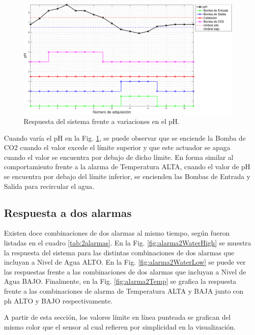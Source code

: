 \begin{figure}[h]
\centering
    \includegraphics[width=\textwidth]{./Figures/plot1pH.pdf}
	\caption{Respuesta del sistema frente a variaciones en el pH.}
	\label{fig:alarma1pH}
\end{figure}

Cuando varía el pH en la Fig. \ref{fig:alarma1pH}, se puede observar que se enciende la Bomba de CO2 cuando el valor excede el límite superior y que este actuador se apaga cuando el valor se encuentra por debajo de dicho límite.  En forma similar al comportamiento frente a la alarma de Temperatura ALTA, cuando el valor de pH se encuentra por debajo del límite inferior, se encienden las Bombas de Entrada y Salida para recircular el agua.

\subsection{Respuesta a dos alarmas}
\label{sec:2alarma}

Existen doce combinaciones de dos alarmas al mismo tiempo, según fueron listadas en el cuadro \ref{tab:2alarmas}. En la Fig. \ref{fig:alarma2WaterHigh} se muestra la respuesta del sistema para las distintas combinaciones de dos alarmas que incluyan a Nivel de Agua ALTO.  En la Fig. \ref{fig:alarma2WaterLow} se puede ver las respuestas frente a las combinaciones de dos alarmas que incluyan a Nivel de Agua BAJO. Finalmente, en la Fig. \ref{fig:alarma2Temp} se grafica la respuesta frente a las combinaciones de alarma de Temperatura ALTA y BAJA junto con ph ALTO y BAJO respectivamente.

A partir de esta sección, los valores límite en línea punteada se grafican del mismo color que el sensor al cual refieren por simplicidad en la visualización.

